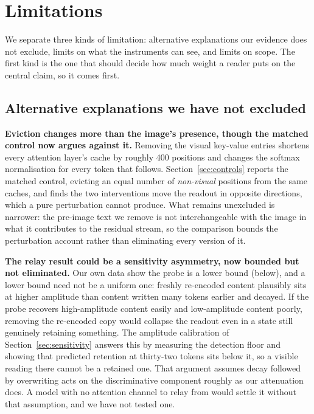 \documentclass[11pt]{article}
\begin{document}
\section{Limitations}

We separate three kinds of limitation: alternative explanations our evidence
does not exclude, limits on what the instruments can see, and limits on scope.
The first kind is the one that should decide how much weight a reader puts on
the central claim, so it comes first.

\subsection{Alternative explanations we have not excluded}

\textbf{Eviction changes more than the image's presence, though the matched
control now argues against it.} Removing the visual key-value entries shortens
every attention layer's cache by roughly 400 positions and changes the softmax
normalisation for every token that follows. Section~\ref{sec:controls} reports
the matched control, evicting an equal number of \emph{non-visual} positions
from the same caches, and finds the two interventions move the readout in
opposite directions, which a pure perturbation cannot produce. What remains
unexcluded is narrower: the pre-image text we remove is not interchangeable with
the image in what it contributes to the residual stream, so the comparison
bounds the perturbation account rather than eliminating every version of it.

\textbf{The relay result could be a sensitivity asymmetry, now bounded but not
eliminated.} Our own data show the probe is a lower bound (below), and a lower
bound need not be a uniform one: freshly re-encoded content plausibly sits at
higher amplitude than content written many tokens earlier and decayed. If the
probe recovers high-amplitude content easily and low-amplitude content poorly,
removing the re-encoded copy would collapse the readout even in a state still
genuinely retaining something. The amplitude calibration of
Section~\ref{sec:sensitivity} answers this by measuring the detection floor and
showing that predicted retention at thirty-two tokens sits below it, so a
visible reading there cannot be a retained one. That argument assumes decay
followed by overwriting acts on the discriminative component roughly as our
attenuation does. A model with no attention channel to relay from would settle
it without that assumption, and we have not tested one.
\end{document}
